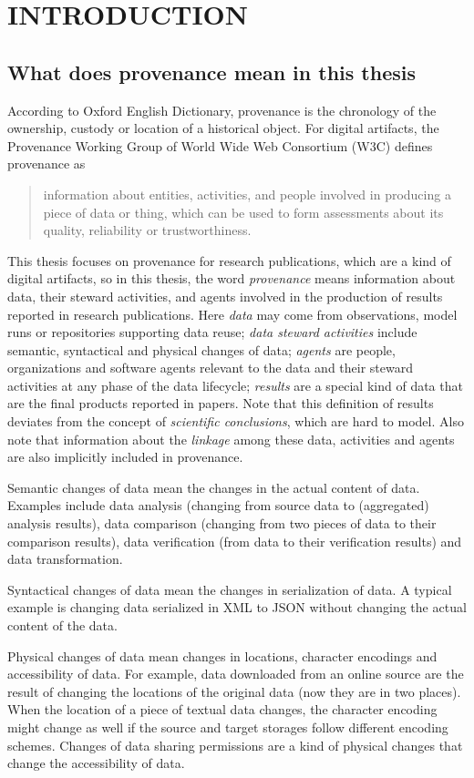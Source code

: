 \chapter{INTRODUCTION}
\section{What does provenance mean in this thesis}
According to Oxford English Dictionary, provenance is the chronology of the ownership, custody or 
location of a historical object. For digital artifacts, the Provenance Working Group of World Wide 
Web Consortium (W3C) defines provenance as \begin{quote}information about entities, activities, and 
people involved in producing a piece of data or thing, which can be used to form assessments about 
its quality, reliability or trustworthiness.\end{quote} This thesis focuses on provenance for 
research publications, which are a kind of digital artifacts, so in this thesis, the word 
\emph{provenance} means information about data, their steward activities, and agents involved in the 
production of results reported in research publications. Here \emph{data} may come from observations, 
model runs or repositories supporting data reuse; \emph{data steward activities} include semantic, 
syntactical and physical changes of data; \emph{agents} are people, organizations and software agents 
relevant to the data and their steward activities at any phase of the data lifecycle; \emph{results} 
are a special kind of data that are the final products reported in papers. Note that this definition 
of results deviates from the concept of \emph{scientific conclusions}, which are hard to model.
 Also note that information about the \emph{linkage} among these 
data, activities and agents are also implicitly included in provenance.

Semantic changes of data mean the changes in the actual content of data. Examples include data 
analysis (changing from source data to (aggregated) analysis results), data comparison (changing from 
two pieces of data to their comparison results), data verification (from data to their verification 
results) and data transformation. 

Syntactical changes of data mean the changes in serialization of data. A typical example is changing 
data serialized in XML to JSON without changing the actual content of the data.

Physical changes of data mean changes in locations, character encodings and accessibility of data. 
For example, data downloaded from an online source are the result of changing the locations of the 
original data (now they are in two places). When the location of a piece of textual data changes, the 
character encoding might change as well if the source and target storages follow different encoding 
schemes. Changes of data sharing permissions are a kind of physical changes that change the 
accessibility of data. 

